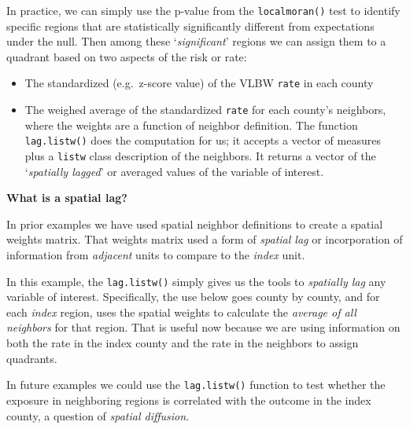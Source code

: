 \documentclass[
]{book}
\providecommand{\tightlist}{%
  \setlength{\itemsep}{0pt}\setlength{\parskip}{0pt}}
\newenvironment{rmdnote}[1]
  {
  \begin{itemize}
  \renewcommand{\labelitemi}{
    \raisebox{-.7\height}[0pt][0pt]{
      {\setkeys{Gin}{width=3em,keepaspectratio}\texttt{[image: images/\#1]}}
    }
  }
  \setlength{\fboxsep}{1em}
  \begin{note}
  \item
  }
  {
  \end{note}
  \end{itemize}
  }
\begin{document}
In practice, we can simply use the p-value from the \texttt{localmoran()} test to identify specific regions that are statistically significantly different from expectations under the null. Then among these `\emph{significant}' regions we can assign them to a quadrant based on two aspects of the risk or rate:

\begin{itemize}
\tightlist
\item
  The standardized (e.g.~z-score value) of the VLBW \texttt{rate} in each county
\item
  The weighed average of the standardized \texttt{rate} for each county's neighbors, where the weights are a function of neighbor definition. The function \texttt{lag.listw()} does the computation for us; it accepts a vector of measures plus a \texttt{listw} class description of the neighbors. It returns a vector of the `\emph{spatially lagged}' or averaged values of the variable of interest.
\end{itemize}

\begin{rmdnote}{note}
\textbf{What is a spatial lag?}

In prior examples we have used spatial neighbor definitions to create a spatial weights matrix. That weights matrix used a form of \emph{spatial lag} or incorporation of information from \emph{adjacent} units to compare to the \emph{index} unit.

In this example, the \texttt{lag.listw()} simply gives us the tools to \emph{spatially lag} any variable of interest. Specifically, the use below goes county by county, and for each \emph{index} region, uses the spatial weights to calculate the \emph{average of all neighbors} for that region. That is useful now because we are using information on both the rate in the index county and the rate in the neighbors to assign quadrants.

In future examples we could use the \texttt{lag.listw()} function to test whether the exposure in neighboring regions is correlated with the outcome in the index county, a question of \emph{spatial diffusion}.

\end{rmdnote}
\end{document}
